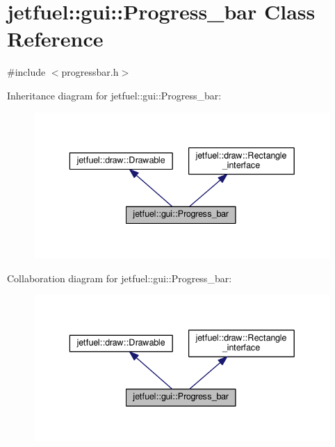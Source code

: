 \hypertarget{classjetfuel_1_1gui_1_1Progress__bar}{}\section{jetfuel\+:\+:gui\+:\+:Progress\+\_\+bar Class Reference}
\label{classjetfuel_1_1gui_1_1Progress__bar}


{\ttfamily \#include $<$progressbar.\+h$>$}



Inheritance diagram for jetfuel\+:\+:gui\+:\+:Progress\+\_\+bar\+:\nopagebreak
\begin{figure}[H]
\begin{center}
\leavevmode
\includegraphics[width=336pt]{classjetfuel_1_1gui_1_1Progress__bar__inherit__graph}
\end{center}
\end{figure}


Collaboration diagram for jetfuel\+:\+:gui\+:\+:Progress\+\_\+bar\+:\nopagebreak
\begin{figure}[H]
\begin{center}
\leavevmode
\includegraphics[width=336pt]{classjetfuel_1_1gui_1_1Progress__bar__coll__graph}
\end{center}
\end{figure}
